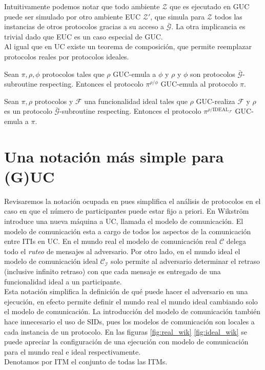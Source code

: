 Intuitivamente podemos notar que todo ambiente $\mathcal{Z}$ que es ejecutado en GUC puede ser simulado por
otro ambiente EUC $\mathcal{Z'}$, que simula para $\mathcal{Z}$ todos las instancias de otros protocolos gracias
a su acceso a $\bar{\mathcal{G}}$. La otra implicancia es trivial dado que EUC es un caso especial de GUC.\\

Al igual que en UC existe un teorema de composición, que permite reemplazar protocolos reales por protocolos
ideales.

\begin{teorema}
Sean $\pi, \rho, \phi$ protocolos tales que $\rho$ GUC-emula a $\phi$ y $\rho$ y $\phi$ son protocolos
$\bar{\mathcal{G}}$-subroutine respecting. Entonces el protocolo $\pi^{\rho/\phi}$ GUC-emula al protocolo $\pi$.
\end{teorema}

\begin{corolario}
Sean $\pi, \rho$ protocolos y $\mathcal{F}$ una funcionalidad ideal tales que $\rho$ GUC-realiza
$\mathcal{F}$ y $\rho$ es un protocolo $\bar{\mathcal{G}}$-subroutine respecting. Entonces el protocolo
$\pi^{\rho/\mathrm{IDEAL}_\mathcal{F}}$ GUC-emula a $\pi$.
\label{corolario:uc-realizacion}
\end{corolario}

\section{Una notación más simple para (G)UC}
\label{sect:simple_uc}

Revisaremos la notación ocupada en \cite{mnCompleto} pues simplifica el análisis de protocolos en el caso
en que el número de participantes puede estar fijo a priori. En \cite{mnCompleto} Wikstr\"om introduce una
nueva máquina a UC, llamada el modelo de comunicación. El modelo de comunicación esta a cargo de todos los
aspectos de la comunicación entre ITIs en UC. En el mundo real el modelo de comunicación real $\mathcal{C}$
delega todo el \textit{ruteo} de mensajes al adversario. Por otro lado, en el mundo ideal el modelo de
comunicación ideal $\mathcal{C_I}$ solo permite al adversario determinar el retraso (inclusive infinito retraso)
con que cada mensaje es entregado de una funcionalidad ideal a un participante.\\
Esta notación simplifica la definición de qué puede hacer el
adversario en una ejecución, en efecto permite definir el mundo real el mundo ideal cambiando solo el modelo
de comunicación. La introducción del modelo de comunicación también hace innecesario
el uso de SIDs, pues los modelos de comunicación son locales a cada instancia de un protocolo.
En las figuras \ref{fig:real_wik} \ref{fig:ideal_wik}
se puede apreciar la configuración de una ejecución con modelo de comunicación para el mundo real e ideal
respectivamente.\\
Denotamos por $\textrm{ITM}$ el conjunto de todas las ITMs.

